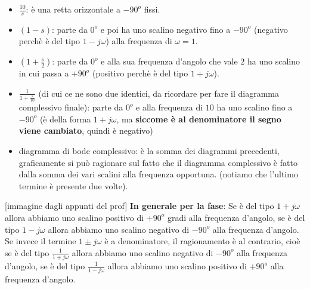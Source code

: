 \begin{itemize}
    \item $\frac{10}{s}$: è una retta orizzontale a $-90^o$ fissi.
    \item $(1-s)$: parte da $0^o$ e poi ha uno scalino negativo fino a $-90^o$ (negativo perchè è del tipo $1-j \omega$) alla frequenza di $\omega=1$.
    \item $(1+\frac{s}{2})$:  parte da $0^o$ e alla sua frequenza d'angolo che vale $2$ ha uno scalino in cui passa a $+ 90^o$ (positivo perchè è del tipo $1+j \omega$).
    \item $\frac{1}{1 + \frac{s}{10}}$ (di cui ce ne sono due identici, da ricordare per fare il diagramma complessivo finale): parte da $0^o$ e alla frequenza di $10$ ha uno scalino fino a $-90^o$ (è della forma $1 + j \omega$, ma \textbf{siccome è al denominatore il segno viene cambiato}, quindi è negativo)
    \item diagramma di bode complessivo: è la somma dei diagrammi precedenti, graficamente si può ragionare sul fatto che il diagramma complessivo è fatto dalla somma dei vari scalini alla frequenza opportuna. (notiamo che l'ultimo termine è presente due volte).
\end{itemize}
[immagine dagli appunti del prof]\newline
\newline
\textbf{In generale per la fase}: Se è del tipo $1+j \omega$ allora abbiamo uno scalino positivo di $+90^o$ gradi alla frequenza d'angolo, se è del tipo $1- j \omega$ allora abbiamo uno scalino negativo di $-90^o$ alla frequenza d'angolo. Se invece il termine $1\pm j \omega$ è a denominatore, il ragionamento è al contrario, cioè se è del tipo $\frac{1}{1+j \omega}$ allora abbiamo uno scalino negativo di $-90^o$ alla frequenza d'angolo, se è del tipo $\frac{1}{1- j \omega}$ allora abbiamo uno scalino positivo di $+90^o$ alla frequenza d'angolo.
